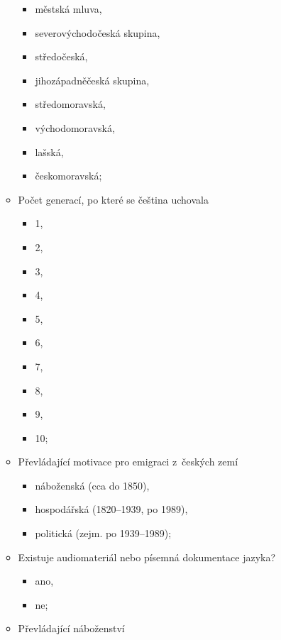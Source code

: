 \begin{itemize}
\begin{itemize}
    \begin{itemize}
    \tightlist
    \item
      městská mluva,
    \item
      severovýchodočeská skupina,
    \item
      středočeská,
    \item
      jihozápadněčeská skupina,
    \item
      středomoravská,
    \item
      východomoravská,
    \item
      lašská,
    \item
      českomoravská;
    \end{itemize}
  \item
    Počet generací, po které se čeština uchovala

    \begin{itemize}
    \tightlist
    \item
      1,
    \item
      2,
    \item
      3,
    \item
      4,
    \item
      5,
    \item
      6,
    \item
      7,
    \item
      8,
    \item
      9,
    \item
      10;
    \end{itemize}
  \item
    Převládající motivace pro emigraci z~českých zemí

    \begin{itemize}
    \tightlist
    \item
      náboženská (cca do 1850),
    \item
      hospodářská (1820--1939, po 1989),
    \item
      politická (zejm. po 1939--1989);
    \end{itemize}
  \item
    Existuje audiomateriál nebo písemná dokumentace jazyka?

    \begin{itemize}
    \tightlist
    \item
      ano,
    \item
      ne;
    \end{itemize}
  \item
    Převládající náboženství


\end{itemize}
\end{itemize}
